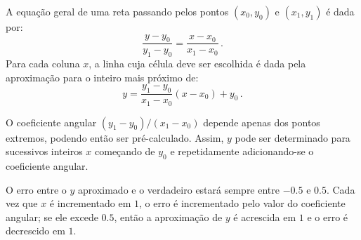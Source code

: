 A equação geral de uma reta passando pelos pontos $(x_0,y_0)$ e  $(x_1,y_1)$
é dada por:
\begin{equation*}
\frac{y-y_0}{y_1-y_0}=\frac{x-x_0}{x_1-x_0}\,.
\end{equation*}
Para cada coluna $x$, a linha cuja célula deve ser escolhida é dada pela
aproximação para o inteiro mais próximo de:
\begin{equation*}
y=\frac{y_1-y_0}{x_1-x_0}(x-x_0) + y_0\,.
\end{equation*}

O coeficiente angular $(y_1-y_0)/(x_1-x_0)$ depende apenas dos pontos
extremos, podendo então ser pré-calculado. Assim, $y$ pode ser determinado para
sucessivos inteiros $x$ começando de $y_0$ e repetidamente adicionando-se o
coeficiente angular.

O erro entre o $y$ aproximado e o verdadeiro estará sempre entre $-0.5$ e
$0.5$. Cada vez que $x$ é incrementado em $1$, o erro é incrementado pelo valor
do coeficiente angular; se ele excede $0.5$, então a aproximação de $y$ é
acrescida em $1$ e o erro é decrescido em $1$.

\nocite{wiki:Bresenham_line}
